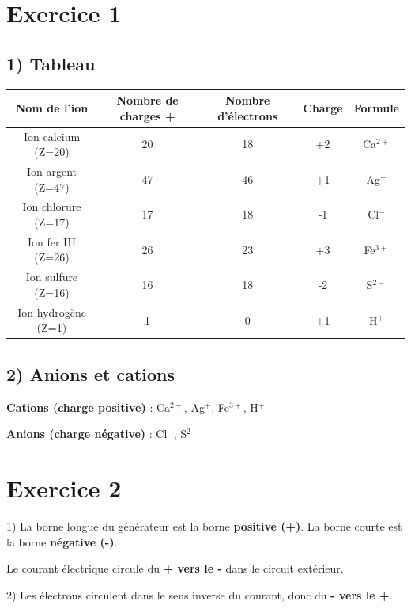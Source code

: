 \documentclass[12pt]{article}
\begin{document}


\section*{Exercice 1}

\subsection*{1) Tableau}

\begin{center}
\begin{tabular}{|c|c|c|c|c|}
\hline
Nom de l’ion & Nombre de charges + & Nombre d’électrons & Charge & Formule \\ \hline
Ion calcium (Z=20) & 20 & 18 & +2 & Ca$^{2+}$ \\ \hline
Ion argent (Z=47) & 47 & 46 & +1 & Ag$^{+}$ \\ \hline
Ion chlorure (Z=17) & 17 & 18 & -1 & Cl$^{-}$ \\ \hline
Ion fer III (Z=26) & 26 & 23 & +3 & Fe$^{3+}$ \\ \hline
Ion sulfure (Z=16) & 16 & 18 & -2 & S$^{2-}$ \\ \hline
Ion hydrogène (Z=1) & 1 & 0 & +1 & H$^{+}$ \\ \hline
\end{tabular}
\end{center}

\subsection*{2) Anions et cations}

\textbf{Cations (charge positive)} : Ca$^{2+}$, Ag$^{+}$, Fe$^{3+}$, H$^{+}$  

\textbf{Anions (charge négative)} : Cl$^{-}$, S$^{2-}$

\bigskip
\section*{Exercice 2}

1) La borne longue du générateur est la borne \textbf{positive (+)}.  
La borne courte est la borne \textbf{négative (-)}.  

Le courant électrique circule du \textbf{+ vers le -} dans le circuit extérieur.

2) Les électrons circulent dans le sens inverse du courant, donc du \textbf{- vers le +}.
\end{document}
